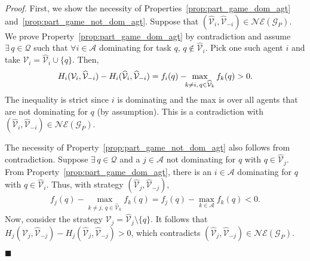 \documentclass{IEEEtran}
\newcommand{\ldef}{:=}
\newcommand{\Mcal}[1]{\mathcal{#1}}
\newcommand{\Mc}[1]{\mathcal{#1}}
\newcommand{\squaresym}{\hbox{$\blacksquare$}}
\newcommand{\proofend}{\relax\ifmmode\else\unskip\hfill\fi\squaresym}
\renewenvironment{proof}{\textit{Proof.} }{\proofend}
\renewcommand{\hat}[1]{\widehat{#1}}
\newcommand{\marginn}[1]{\marginpar{\color{blue}\tiny\ttfamily#1}}
\newcommand{\margin}[1]{\marginpar{\color{magenta}\tiny\ttfamily#1}}
\def \agt{\Mcal{A}}
\def \alloc{\Mcal{V}}
\def \alloch{\hat{\alloc}}
\def \game{\mathscr{G}}
\def \ne{\Mc{NE}}
\def \tsk{\Mc{Q}}
\begin{document}
\begin{proof}
  First, we show the necessity of Properties~\ref{prop:part_game_dom_agt} and~\ref{prop:part_game_not_dom_agt}.
Suppose that $(\alloch_i,\alloch_{-i}) \in \ne(\game_P)$.
  We prove Property~\ref{prop:part_game_dom_agt}
by contradiction and assume $\exists \,q \in \tsk$ such that $\forall i \in \agt$ dominating for task $q$, $q \notin \alloch_i$. Pick one such agent $i$ and take $\alloc_i = \alloch_i \cup \{q\}$. Then, 
\begin{align*}
	H_i(\alloc_i,\alloch_{-i}) - H_i(\alloch_i,\alloch_{-i}) = f_i(q) - \hspace{-1ex} \max_{k \neq i, \, q \in \alloch_k} f_k(q)>0 .
\end{align*}
The inequality is strict since $i$ is dominating  and the max is over all agents that are not dominating for $q$ (by assumption). This is a contradiction with  $(\alloch_i,\alloch_{-i}) \in \ne(\game_P)$.

The necessity of Property~\ref{prop:part_game_not_dom_agt} also follows from contradiction. Suppose $\exists \, q \in \tsk$ and a $j \in \agt$ 
not dominating for $q$ with $q \in \alloch_j$. From Property~\ref{prop:part_game_dom_agt}, there is an
$i \in \agt$ dominating for $q$ with $q \in \alloch_i$. Thus, with strategy $(\alloch_j,\alloch_{-j})$, 
\begin{align*}
f_j(q) - \max_{k \neq j, \, q \in \alloch_k} f_k(q) = f_j(q) - \max_{k \in \agt} f_k(q) < 0. 
\end{align*}
Now, consider the strategy $\alloc_j = \alloch_j \setminus \{q\}$. It
follows that
$H_j(\alloc_j,\alloch_{-j}) - H_j(\alloch_j,\alloch_{-j}) > 0$, which contradicts 
$(\alloch_j,\alloch_{-j}) \in \ne(\game_P)$.


\end{proof}
\end{document}
